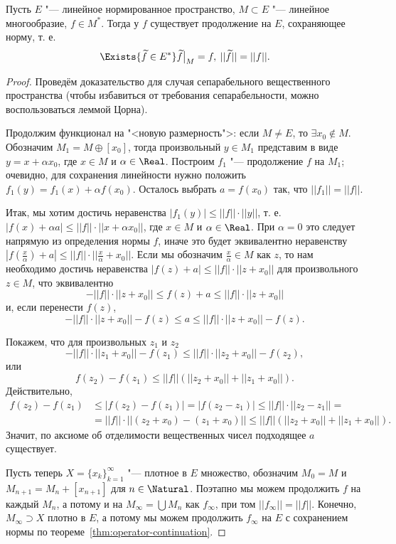 \documentclass[main]{subfiles}
\begin{document}
\begin{theorem}
  Пусть \( E \) "--- линейное нормированное пространство,
  \( M \subset E \) "--- линейное многообразие,
  \( f \in M^* \).
  Тогда у \( f \) существует продолжение на \( E \), сохраняющее норму,
  т. е.
  \[
    \Exists{\widetilde{f} \in E^*}
    \widetilde{f} \bigr|_M = f, \:
    ||\widetilde{f}|| = ||f||.
  \]
\end{theorem}
\begin{proof}
  Проведём доказательство для случая
  сепарабельного вещественного пространства
  (чтобы избавиться от требования сепарабельности,
  можно воспользоваться леммой Цорна).

  Продолжим функционал на "<новую размерность">: если
  $M \ne E$, то $\exists x_0 \notin M$.
  Обозначим $M_1 = M \oplus [ x_0 ]$, тогда произвольный \( y \in M_1 \)
  представим в виде $y = x + \alpha x_0$,
  где \( x \in M \) и \( \alpha \in \Real \).
  Построим \( f_1 \) "--- продолжение \( f \) на \( M_1 \);
  очевидно, для сохранения линейности нужно положить
  $f_1(y) = f_1(x) + \alpha f(x_0)$.
  Осталось выбрать $a = f(x_0)$ так, что $||f_1|| = ||f||$.
  
  Итак, мы хотим достичь неравенства $|f_1(y)| \le ||f|| \cdot ||y||$,
  т. е. $|f(x) + \alpha a| \le ||f|| \cdot ||x + \alpha x_0||$,
  где $x \in M$ и $\alpha \in \Real$.
  При \( \alpha = 0 \) это следует напрямую из определения нормы \( f \),
  иначе это будет эквивалентно неравенству
  $|f(\frac{x}{\alpha}) + a| \le ||f|| \cdot ||\frac{x}{\alpha} + x_0||$.
  Если мы обозначим $\frac{x}\alpha \in M$ как \( z \),
  то нам необходимо достичь неравенства $|f(z) + a| \le ||f|| \cdot ||z + x_0||$
  для произвольного $z \in M$, что эквивалентно
  \[ -||f|| \cdot ||z + x_0|| \le f(z) + a \le ||f|| \cdot ||z + x_0|| \]
  и, если перенести \( f(z) \),
  \[ -||f|| \cdot ||z + x_0|| - f(z) \le a \le ||f|| \cdot ||z + x_0|| - f(z). \]
  
  Покажем, что для произвольных $z_1$ и $z_2$
  \[
    -||f|| \cdot ||z_1 + x_0|| - f(z_1) \le ||f|| \cdot ||z_2 + x_0|| - f(z_2),
  \]
  или
  \[
    f(z_2) - f(z_1) \le ||f|| (||z_2 + x_0|| + ||z_1 + x_0||).
  \]
  Действительно,
  \begin{align}
    f(z_2) - f(z_1) &\le |f(z_2) - f(z_1)| = |f(z_2 - z_1)| \le ||f|| \cdot ||z_2 - z_1|| = \\
		    &= ||f|| \cdot ||(z_2 + x_0) - (z_1 + x_0)|| \le ||f|| (||z_2 + x_0|| + ||z_1 + x_0||).
  \end{align}
  Значит, по аксиоме об отделимости вещественных чисел подходящее \( a \) существует.

  Пусть теперь $X = \{ x_k \}_{k = 1}^\infty$ "--- плотное в $E$ множество,
  обозначим $M_0 = M$ и $M_{n + 1} = M_n + [x_{n+1}]$ для $n \in \Natural$.
  Поэтапно мы можем продолжить $f$ на каждый $M_n$, а потому и на
  $M_\infty = \bigcup M_n$ как $f_\infty$, при том $||f_\infty|| = ||f||$.
  Конечно, $M_\infty \supset X$ плотно в $E$, а потому мы можем продолжить
  $f_\infty$ на $E$ с сохранением нормы по
  теореме~\ref{thm:operator-continuation}.
\end{proof}
\end{document}
